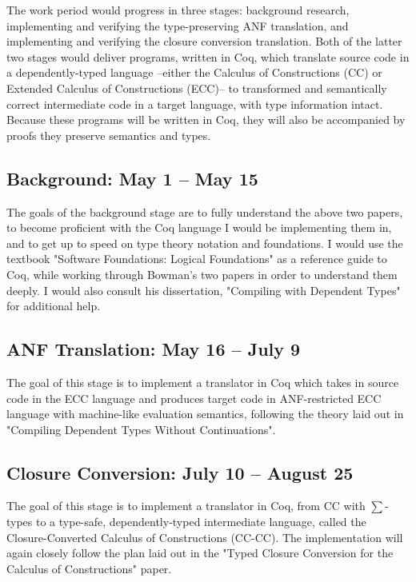 \documentclass[manuscript]{acmart}
\begin{document}
The work period would progress in three stages: background research, implementing and verifying the type-preserving ANF translation, and implementing and verifying the closure conversion translation. Both of the latter two stages would deliver programs, written in Coq, which translate source code in a dependently-typed language --either the Calculus of Constructions (CC) or Extended Calculus of Constructions (ECC)-- to transformed and semantically correct intermediate code in a target language, with type information intact. Because these programs will be written in Coq, they will also be accompanied by proofs they preserve semantics and types. 

\subsection{Background: May 1 -- May 15}
The goals of the background stage are to fully understand the above two papers, to become proficient with the Coq language I would be implementing them in, and to get up to speed on type theory notation and foundations. I would use the textbook "Software Foundations: Logical Foundations" as a reference guide to Coq, while working through 
Bowman's two papers in order to understand them deeply. I would also consult his dissertation, "Compiling with Dependent Types" \cite{bowman_2019} for additional help.


\subsection{ANF Translation: May 16 -- July 9}
The goal of this stage is to implement a translator in Coq which takes in source code in the ECC language and produces target code in ANF-restricted ECC language with machine-like evaluation semantics, following the theory laid out in "Compiling Dependent Types Without Continuations".

\subsection{Closure Conversion: July 10 -- August 25}
The goal of this stage is to implement a translator in Coq, from CC with $\sum$-types to a type-safe, dependently-typed intermediate language, called the Closure-Converted Calculus of Constructions (CC-CC). The implementation will again closely follow the plan laid out in the "Typed Closure Conversion for the Calculus of Constructions" paper. 



\end{document}
